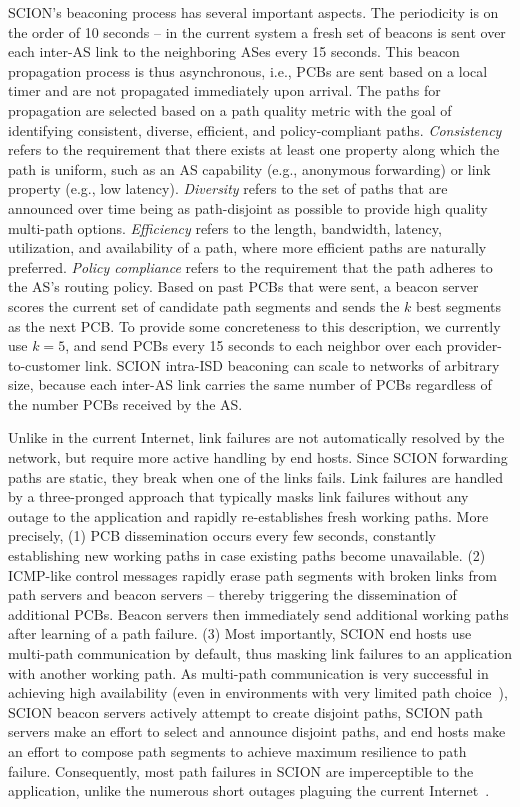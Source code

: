 \documentclass[a4paper]{llncs}
\newcommand\SCION{{\small\textsf{SCION}}\xspace}
\begin{document}
\SCION's beaconing process has several important aspects. The periodicity is on
the order of 10 seconds -- in the current system a fresh set of beacons is sent
over each inter-AS link to the neighboring ASes every 15 seconds. This beacon
propagation process is thus asynchronous, i.e., PCBs are sent based on a local
timer and are not propagated immediately upon arrival. The paths for propagation
are selected based on a path quality metric with the goal of identifying
consistent, diverse, efficient, and policy-compliant paths.  \emph{Consistency}
refers to the requirement that there exists at least one property along which
the path is uniform, such as an AS capability (e.g., anonymous forwarding) or link
property (e.g., low latency).
\emph{Diversity} refers to the set of paths that are announced over time being
as path-disjoint as possible to provide high quality multi-path options.
\emph{Efficiency} refers to the length, bandwidth, latency, utilization, and
availability of a path, where more efficient paths are naturally preferred.
\emph{Policy compliance} refers to the requirement that the path adheres to the
AS's routing policy.  Based on past PCBs that were sent, a beacon server scores
the current set of candidate path segments and sends the $k$ best segments as the next PCB.
To provide some concreteness to this description, we currently use $k=5$, and
send PCBs every 15 seconds to each neighbor over each provider-to-customer link.  \SCION
intra-ISD beaconing can scale to networks of arbitrary size, because each
inter-AS link carries the same number of PCBs regardless of the number PCBs
received by the AS.

Unlike in the current Internet, link failures are not automatically resolved by
the network, but require more active handling by end hosts.  Since \SCION
forwarding paths are static, they break when one of the links fails. Link
failures are handled by a three-pronged approach that typically masks link
failures without any outage to the application and rapidly re-establishes fresh
working paths. More precisely, 
(1) PCB dissemination occurs every few seconds, constantly establishing new working paths
in case existing paths become unavailable. 
(2) ICMP-like control messages rapidly erase path segments with broken links from path
servers and beacon servers -- thereby triggering the dissemination of additional
PCBs. Beacon servers then immediately send 
additional working paths after
learning of a path failure.  
(3) Most importantly, \SCION end hosts use multi-path communication by default,
thus masking link failures to an application with another working path.  As multi-path communication is very successful in achieving high
availability (even in environments with very limited path
choice~\cite{AnBaKaMo2001}), \SCION beacon servers actively attempt to create
disjoint paths, \SCION path servers make an effort to select and announce
disjoint paths, and end hosts make an effort to compose path segments to achieve
maximum resilience to path failure.  Consequently, most path failures in \SCION
are imperceptible to the application, unlike the numerous short outages plaguing
the current Internet~\cite{KusKanKat2007,KSCCVFMAK2012}.
\end{document}
